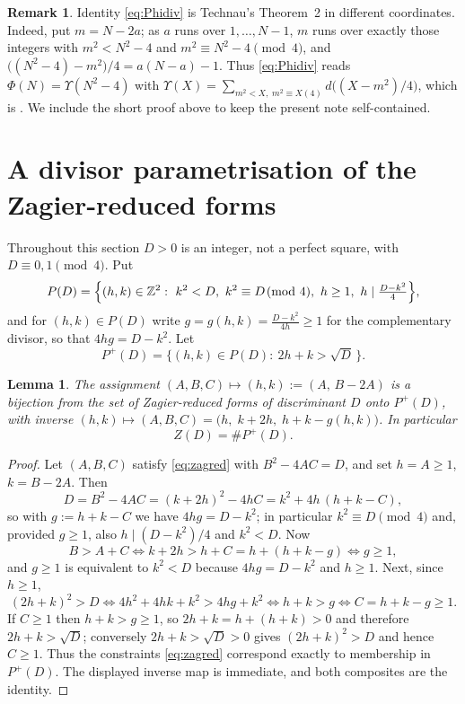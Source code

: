 \documentclass[11pt,reqno]{amsart}
\theoremstyle{plain}
\newtheorem{lemma}[theorem]{Lemma}
\theoremstyle{definition}
\newtheorem{remark}[theorem]{Remark}
\newcommand{\Z}{\mathbb{Z}}
\begin{document}
\begin{remark}\label{rem:technau2}
Identity \eqref{eq:Phidiv} is Technau's Theorem~2 \cite{Technau} in different
coordinates. Indeed, put $m=N-2a$; as $a$ runs over $1,\dots,N-1$, $m$ runs over exactly
those integers with $m^2<N^2-4$ and $m^2\equiv N^2-4\pmod 4$, and
$\bigl((N^2-4)-m^2\bigr)/4=a(N-a)-1$. Thus \eqref{eq:Phidiv} reads
$\Phi(N)=\Upsilon(N^2-4)$ with
$\Upsilon(X)=\sum_{m^2<X,\;m^2\equiv X (4)}d\bigl((X-m^2)/4\bigr)$, which is
\cite[Theorem~2]{Technau}. We include the short proof above to keep the present note
self-contained.
\end{remark}

\section{A divisor parametrisation of the Zagier-reduced forms}\label{sec:param}

Throughout this section $D>0$ is an integer, not a perfect square, with
$D\equiv0,1\pmod4$. Put
\begin{equation}\label{eq:P}
  P(D)=\Bigl\{(h,k)\in\Z^2:\ k^2<D,\ k^2\equiv D\!\!\pmod 4,\ h\ge1,\
  h\mid\tfrac{D-k^2}{4}\Bigr\},
\end{equation}
and for $(h,k)\in P(D)$ write $g=g(h,k)=\frac{D-k^2}{4h}\ge1$ for the complementary
divisor, so that $4hg=D-k^2$. Let
\begin{equation}\label{eq:Pplus}
  P^{+}(D)=\bigl\{(h,k)\in P(D):\ 2h+k>\sqrt{D}\,\bigr\}.
\end{equation}

\begin{lemma}\label{lem:param}
The assignment $(A,B,C)\mapsto(h,k):=(A,\,B-2A)$ is a bijection from the set of
Zagier-reduced forms of discriminant $D$ onto $P^{+}(D)$, with inverse
$(h,k)\mapsto(A,B,C)=\bigl(h,\;k+2h,\;h+k-g(h,k)\bigr)$. In particular
\[
  Z(D)=\#P^{+}(D).
\]
\end{lemma}

\begin{proof}
Let $(A,B,C)$ satisfy \eqref{eq:zagred} with $B^2-4AC=D$, and set $h=A\ge1$,
$k=B-2A$. Then
\[
  D=B^2-4AC=(k+2h)^2-4hC=k^2+4h\,(h+k-C),
\]
so with $g:=h+k-C$ we have $4hg=D-k^2$; in particular $k^2\equiv D\pmod4$ and, provided
$g\ge1$, also $h\mid (D-k^2)/4$ and $k^2<D$. Now
\[
  B>A+C \iff k+2h>h+C=h+(h+k-g) \iff g\ge 1 ,
\]
and $g\ge1$ is equivalent to $k^2<D$ because $4hg=D-k^2$ and $h\ge1$. Next, since
$h\ge1$,
\[
  (2h+k)^2>D \iff 4h^2+4hk+k^2>4hg+k^2 \iff h+k>g \iff C=h+k-g\ge1 .
\]
If $C\ge1$ then $h+k>g\ge1$, so $2h+k=h+(h+k)>0$ and therefore $2h+k>\sqrt D$; conversely
$2h+k>\sqrt D>0$ gives $(2h+k)^2>D$ and hence $C\ge1$. Thus the constraints
\eqref{eq:zagred} correspond exactly to membership in $P^{+}(D)$. The displayed inverse
map is immediate, and both composites are the identity.
\end{proof}
\end{document}
